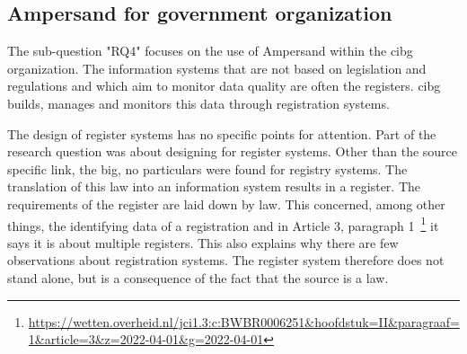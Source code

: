 \subsection{Ampersand for government organization}\label{subsection:ampersand-for-government-organization}
The sub-question "\acrlong{RQ4}" focuses on the use of Ampersand within the \acrshort{cibg} organization.
The information systems that are not based on legislation and regulations and which aim to monitor data quality are often the registers.
\acrshort{cibg} builds, manages and monitors this data through registration systems.











The design of register systems has no specific points for attention.
Part of the research question was about designing for register systems.
Other than the source specific link, the \acrshort{big}, no particulars were found for registry systems.
The translation of this law into an information system results in a register.
The requirements of the register are laid down by law.
This concerned, among other things, the identifying data of a registration and in Article 3, paragraph 1~\footnote{\url{https://wetten.overheid.nl/jci1.3:c:BWBR0006251&hoofdstuk=II&paragraaf=1&article=3&z=2022-04-01&g=2022-04-01}} it says it is about multiple registers.
This also explains why there are few observations about registration systems.
The register system therefore does not stand alone, but is a consequence of the fact that the source is a law.